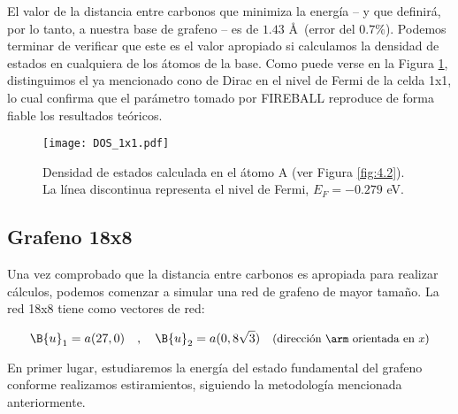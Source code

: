 El valor de la distancia entre carbonos que minimiza la energía -- y que definirá, por lo tanto, a nuestra base de grafeno -- es de $1.43$ \AA\  (error del $0.7\%$). Podemos terminar de verificar que este es el valor apropiado si calculamos la densidad de estados en cualquiera de los átomos de la base. Como puede verse en la Figura \ref{fig:4.4}, distinguimos el ya mencionado cono de Dirac en el nivel de Fermi de la celda 1x1, lo cual confirma que el parámetro tomado por FIREBALL reproduce de forma fiable los resultados teóricos.

\begin{figure}[!h]
    \centering
    \texttt{[image: DOS\_1x1.pdf]}
    \caption{Densidad de estados calculada en el átomo A (ver Figura \ref{fig:4.2}). La línea discontinua representa el nivel de Fermi, $E_F = -0.279$ eV.}
    \label{fig:4.4}
\end{figure}


\subsection{Grafeno 18x8}

Una vez comprobado que la distancia entre carbonos es apropiada para realizar cálculos, podemos comenzar a simular una red de grafeno de mayor tamaño. La red 18x8 tiene como vectores de red:

\begin{equation}
    \B{u}_1 = a (27,0)\quad , \quad \B{u}_2 = a (0,8\sqrt{3}) \quad {\text{\small (dirección \arm orientada en $x$)}}
\end{equation}

En primer lugar, estudiaremos la energía del estado fundamental del grafeno conforme realizamos estiramientos, siguiendo la metodología mencionada anteriormente. 

